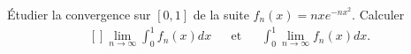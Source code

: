 

\begin{exercice}\label{exo116}

Étudier la convergence sur $[0,1]$ de la suite $f_n(x)=nx e^{-nx^2}$. Calculer
\begin{equation}
	\begin{aligned}[]
		\lim_{n\to\infty}\int_0^1f_n(x)dx	&&	\text{et}	&&	\int_0^1\lim_{n\to\infty}f_n(x)dx.
	\end{aligned}
\end{equation}

\end{exercice}
